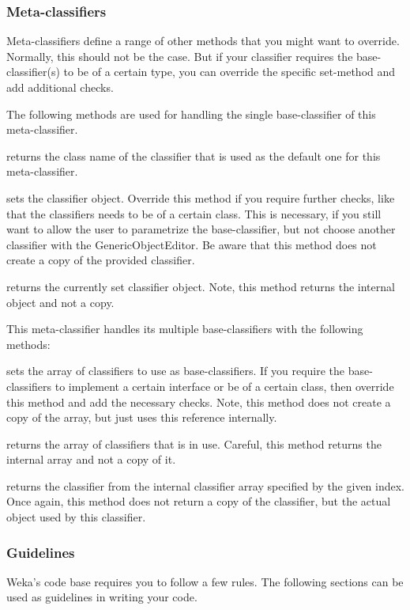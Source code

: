 \newpage
\subsubsection*{Meta-classifiers}
Meta-classifiers define a range of other methods that you might want to
override. Normally, this should not be the case. But if your classifier requires
the base-classifier(s) to be of a certain type, you can override the specific
set-method and add additional checks.

The following methods are used for handling the single base-classifier of this
meta-classifier.

 returns the class name of the classifier
that is used as the default one for this meta-classifier.

 sets the classifier object. Override this
method if you require further checks, like that the classifiers needs to be of
a certain class. This is necessary, if you still want to allow the user to
parametrize the base-classifier, but not choose another classifier with the
GenericObjectEditor. Be aware that this method does not create a copy of the
provided classifier.

 returns the currently set classifier object. Note,
this method returns the internal object and not a copy.

This meta-classifier handles its multiple base-classifiers with the following
methods:

 sets the array of classifiers to use
as base-classifiers. If you require the base-classifiers to implement a certain
interface or be of a certain class, then override this method and add the
necessary checks. Note, this method does not create a copy of the array, but
just uses this reference internally.

 returns the array of classifiers that is in use.
Careful, this method returns the internal array and not a copy of it.

 returns the classifier from the internal
classifier array specified by the given index. Once again, this method does not
return a copy of the classifier, but the actual object used by this classifier.

\newpage
\subsubsection{Guidelines}
Weka's code base requires you to follow a few rules. The following sections can
be used as guidelines in writing your code.

